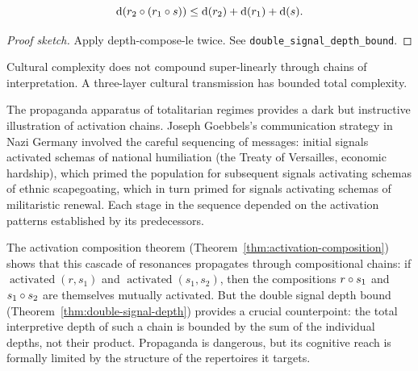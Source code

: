 \begin{theorem}
\label{thm:double-signal-depth}
\[
  \operatorname{d}(r_2 \circ (r_1 \circ s))
  \leq \operatorname{d}(r_2) + \operatorname{d}(r_1) + \operatorname{d}(s).
\]
\end{theorem}

\begin{proof}[Proof sketch]
Apply depth-compose-le twice.  See \texttt{double\_signal\_depth\_bound}.
\end{proof}

\begin{remark}
Cultural complexity does not compound super-linearly through chains of
interpretation.  A three-layer cultural transmission has bounded total
complexity.
\end{remark}

\begin{example}
\label{ex:propaganda}
The propaganda apparatus of totalitarian regimes provides a dark but
instructive illustration of activation chains.  Joseph Goebbels's
communication strategy in Nazi Germany involved the careful sequencing
of messages: initial signals activated schemas of national humiliation
(the Treaty of Versailles, economic hardship), which primed the
population for subsequent signals activating schemas of ethnic
scapegoating, which in turn primed for signals activating schemas of
militaristic renewal.  Each stage in the sequence depended on the
activation patterns established by its predecessors.

The activation composition theorem
(Theorem~\ref{thm:activation-composition}) shows that this cascade of
resonances propagates through compositional chains: if
$\operatorname{activated}(r, s_1)$ and
$\operatorname{activated}(s_1, s_2)$, then the compositions
$r \circ s_1$ and $s_1 \circ s_2$ are themselves mutually
activated.  But the double signal depth bound
(Theorem~\ref{thm:double-signal-depth}) provides a crucial
counterpoint: the total interpretive depth of such a chain is bounded
by the sum of the individual depths, not their product.  Propaganda
is dangerous, but its cognitive reach is formally limited by the
structure of the repertoires it targets.
\end{example}

